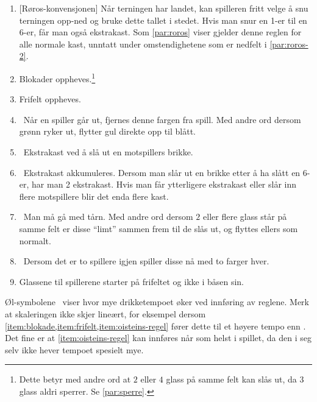 \documentclass[10pt,a4paper,norsk,openany]{book}
\begin{document}
\begin{enumerate}
  \item\phantom{.}[Røros-konvensjonen] Når terningen har landet, kan
    spilleren fritt velge å snu terningen opp-ned og bruke dette tallet i
    stedet. Hvis man snur en 1-er til en 6-er, får man også ekstrakast. Som
    \cref{par:roros} viser gjelder denne reglen for alle normale kast, unntatt
    under omstendighetene som er nedfelt i \cref{par:roros-2}.

  \item \faBeer \label{item:blokade} Blokader oppheves.\footnote{Dette betyr med
    andre ord at $2$ eller $4$ glass på samme felt kan slås ut, da $3$ glass
    aldri sperrer. Se \cref{par:sperre}.}

  \item \faBeer \label{item:frifelt} Frifelt oppheves.

  \item \faBeer \ Når en spiller går ut, fjernes denne fargen fra spill. Med
    andre ord dersom grønn ryker ut, flytter gul direkte opp til blått. 

  \item \faBeer \faBeer \ Ekstrakast ved å slå ut en motspillers brikke.

  \item \faBeer \faBeer \ Ekstrakast akkumuleres. Dersom man slår ut en brikke
    etter å ha slått en 6-er, har man 2 ekstrakast. Hvis man får ytterligere
    ekstrakast eller slår inn flere motspillere blir det enda flere kast.

  \item \faBeer \faBeer \ Man må gå med tårn. Med andre ord dersom $2$ eller
    flere glass står på samme felt er disse ``limt'' sammen frem til de slås ut,
    og flyttes ellers som normalt. 

  \item \faBeer \faBeer \faBeer \ Dersom det er to spillere igjen spiller disse
    nå med to farger hver.

  \item \faBeer \faBeer \label{item:oisteins-regel} Glassene til spillerene
    starter på frifeltet og ikke i båsen sin.
\end{enumerate}

Øl-symbolene \faBeer\ viser hvor mye drikketempoet øker ved innføring av reglene.
Merk at skaleringen ikke skjer lineært, for eksempel dersom
\cref{item:blokade,item:frifelt,item:oisteins-regel} fører dette til et høyere tempo
enn \faBeer\faBeer\faBeer\faBeer. Det fine er at \cref{item:oisteins-regel} kan
innføres når som helst i spillet, da den i seg selv ikke hever tempoet spesielt mye.
\end{document}
